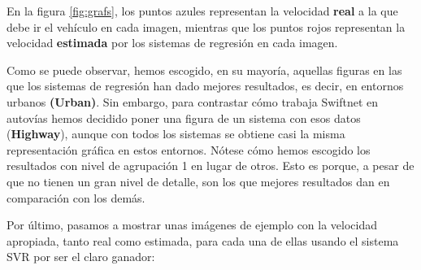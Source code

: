 En la figura \ref{fig:grafs}, los puntos azules representan la velocidad \textbf{real} a la que debe ir el vehículo en cada imagen, mientras que los puntos rojos representan la velocidad \textbf{estimada} por los sistemas de regresión en cada imagen.

Como se puede observar, hemos escogido, en su mayoría, aquellas figuras en las que los sistemas de regresión han dado mejores resultados, es decir, en entornos urbanos \textbf{(Urban)}. Sin embargo, para contrastar cómo trabaja Swiftnet en autovías hemos decidido poner una figura de un sistema con esos datos (\textbf{Highway}), aunque con todos los sistemas se obtiene casi la misma representación gráfica en estos entornos. Nótese cómo hemos escogido los resultados con nivel de agrupación 1 en lugar de otros. Esto es porque, a pesar de que no tienen un gran nivel de detalle, son los que mejores resultados dan en comparación con los demás.

Por último, pasamos a mostrar unas imágenes de ejemplo con la velocidad apropiada, tanto real como estimada, para cada una de ellas usando el sistema \ac{SVR} por ser el claro ganador:

